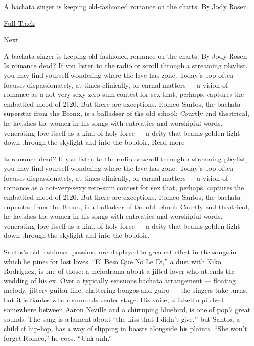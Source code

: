 A bachata singer is keeping old-fashioned romance on the charts. By Jody
Rosen

\href{https://open.spotify.com/track/2kcc5humLS6PKOI9rwvXex?si=5BkZZdxsT_WRJZdWOzyqeg}{Full
Track }

Next

A bachata singer is keeping old-fashioned romance on the charts. By Jody
Rosen Is romance dead? If you listen to the radio or scroll through a
streaming playlist, you may find yourself wondering where the love has
gone. Today's pop often focuses dispassionately, at times clinically, on
carnal matters --- a vision of romance as a not-very-sexy zero-sum
contest for sex that, perhaps, captures the embattled mood of 2020. But
there are exceptions. Romeo Santos, the bachata superstar from the
Bronx, is a balladeer of the old school: Courtly and theatrical, he
lavishes the women in his songs with entreaties and worshipful words,
venerating love itself as a kind of holy force --- a deity that beams
golden light down through the skylight and into the boudoir. Read more

Is romance dead? If you listen to the radio or scroll through a
streaming playlist, you may find yourself wondering where the love has
gone. Today's pop often focuses dispassionately, at times clinically, on
carnal matters --- a vision of romance as a not-very-sexy zero-sum
contest for sex that, perhaps, captures the embattled mood of 2020. But
there are exceptions. Romeo Santos, the bachata superstar from the
Bronx, is a balladeer of the old school: Courtly and theatrical, he
lavishes the women in his songs with entreaties and worshipful words,
venerating love itself as a kind of holy force --- a deity that beams
golden light down through the skylight and into the boudoir.

Santos's old-fashioned passions are displayed to greatest effect in the
songs in which he pines for lost loves. ``El Beso Que No Le Di,'' a duet
with Kiko Rodriguez, is one of those: a melodrama about a jilted lover
who attends the wedding of his ex. Over a typically sensuous bachata
arrangement --- floating melody, jittery guitar line, chattering bongos
and guiro --- the singers take turns, but it is Santos who commands
center stage: His voice, a falsetto pitched somewhere between Aaron
Neville and a chirruping bluebird, is one of pop's great sounds. The
song is a lament about ``the kiss that I didn't give,'' but Santos, a
child of hip-hop, has a way of slipping in boasts alongside his plaints.
``She won't forget Romeo,'' he coos. ``Unh-unh.''

